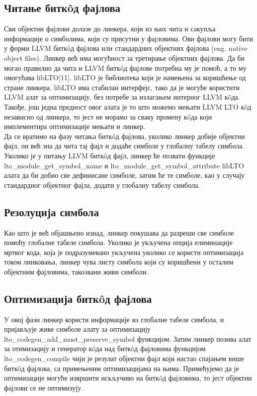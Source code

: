 \documentclass[12pt,oneside]{memoir}
\begin{document}
\subsection{Читање битк\^{o}д фајлова}
Сви објектни фајлови долазе до линкера, који из њих чита и сакупља информације
о симболима, који су присутни у фајловима.
Ови фајлови могу бити у форми LLVM битк\^{o}д фајлова или стандардних објектних
фајлова (eng. native object files).
Линкер већ има могућност за третирање објектних фајлова.
Да би могао
правилно да чита и LLVM битк\^{o}д фајлове потребна му је помоћ, а то му омогућава
 libLTO[11].
libLTO је библиотека који је намењена за коришћење од стране линкера.
libLTO има стабилан интерфејс, тако да је могуће користити
LLVM алат за оптимизацију, без потребе за излагањем интерног LLVM к\^{o}да.
Такође, још једна предност овог алата је то што можемо мењати LLVM LTO к\^{o}д независно
од линкера, то јест не морамо за сваку промену к\^{o}да који имплементира
оптимизације мењати и линкер.
\\
Да се вратимо на фазу читања битк\^{o}д фајлова, уколико линкер добије
објектни фајл, он већ зна да чита тај фајл и додаће симболе у глобалну табелу симбола.
Уколико је у питању LLVM битк\^{o}д фајл, линкер ће позвати функције \\
lto{\_}module{\_}get{\_}symbol{\_}name и 
lto{\_}module{\_}get{\_}symbol{\_}attribute 
libLTO алата да би добио све дефинисане  симболе, затим ће те симболе, 
као у случају стандардног објектног фајла, додати у глобалну табелу симбола.

\subsection{Резолуција симбола}
Као што је већ објашњено изнад, линкер покушава да разреши све симболе помоћу
глобалне табеле симбола.
Уколико је укључена опција елиминације мртвог кода, која је подразумевано укључена
уколико се користи оптимизација током линковања, линкер чува листу симбола који
су коришћени у осталим објектним фајловима, такозвани живи симболи.

\subsection{Оптимизација битк\^{o}д фајлова} 
У овој фази линкер користи информације из глобалне табеле симбола, и пријављује
живе симболе алату за оптимизацију
lto{\_}codegen{\_}add{\_}must{\_}preserve{\_}symbol функцијом.
Затим линкер позива алат за отимизацију и генератор к\^{o}да над битк\^{o}д фајловима
функцијом lto{\_}codegen{\_}compile чији је резулат објектни фајл
који настао спајањем више битк\^{o}д фајлова, са примењеним оптимизацијама на њима.
Примећујемо да је оптимизације могуће извршити искључиво на битк\^{o}д фајловима,
то јест објектни фајлови се не оптимизују.
\end{document}
